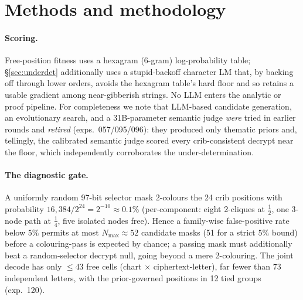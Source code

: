 \documentclass[11pt]{article}
\theoremstyle{plain}
\theoremstyle{definition}
\begin{document}
\section{Methods and methodology}\label{sec:methods}

\paragraph{Scoring.} Free-position fitness uses a hexagram (6-gram) log-probability
table; \S\ref{sec:underdet} additionally uses a stupid-backoff character LM that, by
backing off through lower orders, avoids the hexagram table's hard floor and so
retains a usable gradient among near-gibberish strings. No LLM enters the analytic or
proof pipeline. For completeness we note that LLM-based candidate generation, an
evolutionary search, and a 31B-parameter semantic judge \emph{were} tried in earlier
rounds and \emph{retired} (exps.~057/095/096): they produced only thematic priors
and, tellingly, the calibrated semantic judge scored every crib-consistent decrypt
near the floor, which independently corroborates the under-determination.

\paragraph{The diagnostic gate.} A uniformly random 97-bit selector mask 2-colours
the 24 crib positions with probability $16{,}384/2^{24}=2^{-10}\approx0.1\%$
(per-component: eight 2-cliques at $\tfrac12$, one 3-node path at $\tfrac14$, five
isolated nodes free). Hence a family-wise false-positive rate below $5\%$ permits at
most $N_{\max}\approx52$ candidate masks (51 for a strict $5\%$ bound) before a colouring-pass is expected by chance; a
passing mask must additionally beat a random-selector decrypt null, going beyond a
mere 2-colouring. The joint decode has only $\le43$ free cells (chart $\times$
ciphertext-letter), far fewer than 73 independent letters, with the prior-governed positions in
12 tied groups (exp.~120).
\end{document}
